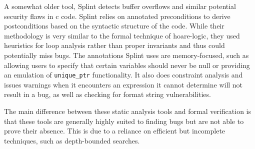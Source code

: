 A somewhat older tool, Splint \autocite{evans2002static} detects buffer overflows
and similar potential security flaws in \gls{c} code.
Splint relies on annotated preconditions to derive postconditions
based on the syntactic structure of the code.
While their methodology is very similar to the formal technique of \gls{hoare-logic},
they used heuristics for loop analysis rather than proper invariants
and thus could potentially miss bugs.
The annotations Splint uses are memory-focused, such as allowing users to specify
that certain variables should never be null or providing an emulation of
\lstinline|unique_ptr| functionality. It also does constraint analysis
and issues warnings when it encounters an expression it cannot determine
will not result in a bug, as well as checking for format string vulnerabilities.

The main difference between these static analysis tools and formal verification
is that these tools are generally highly suited to finding bugs
but are not able to prove their absence. This is due to a reliance on
efficient but incomplete techniques, such as depth-bounded searches.

